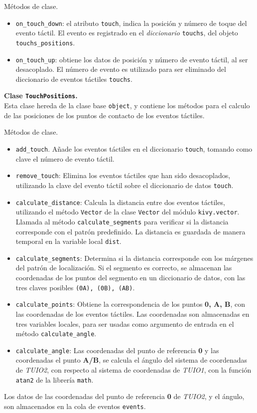 Métodos de clase.
\begin{itemize}
\item \texttt{on\_touch\_down}: el atributo \texttt{touch}, indica la posición y número de toque del evento táctil. El evento es registrado en el \emph{diccionario} \texttt{touchs}, del objeto \texttt{touchs\_positions}.

\item \texttt{on\_touch\_up}: obtiene los datos de posición y número de evento táctil, al ser desacoplado. El número de evento es utilizado para ser eliminado del diccionario de eventos táctiles \texttt{touchs}.
\end{itemize}
\textbf{Clase \texttt{TouchPositions}.}\\ 
Esta clase hereda de la clase base \texttt{object}, y contiene los métodos para el calculo de las posiciones de los puntos de contacto de los eventos táctiles.

Métodos de clase.
\begin{itemize}
\item \texttt{add\_touch}. Añade los eventos táctiles en el diccionario \texttt{touch}, tomando como clave el número de evento táctil.

\item \texttt{remove\_touch}: Elimina los eventos táctiles que han sido desacoplados, utilizando la clave del evento táctil sobre el diccionario de datos \texttt{touch}.

\item \texttt{calculate\_distance}: Calcula la distancia entre dos eventos táctiles, utilizando el método \texttt{Vector} de la clase \texttt{Vector} del módulo \texttt{kivy.vector}. Llamada al método \texttt{calculate\_segments} para verificar si la distancia corresponde con el patrón predefinido. La distancia es guardada de manera temporal en la variable local \texttt{dist}.

\item \texttt{calculate\_segments}: Determina si la distancia corresponde con los márgenes del patrón de localización. Si el segmento es correcto, se almacenan las coordenadas de los puntos del segmento en un diccionario de datos, con las tres claves posibles \texttt{(0A), (0B), (AB)}.

\item \texttt{calculate\_points}: Obtiene la correspondencia de los puntos \textbf{0, A, B}, con las coordenadas de los eventos táctiles. Las coordenadas son almacenadas en tres variables locales, para ser usadas como argumento de entrada en el método \texttt{calculate\_angle}.

\item \texttt{calculate\_angle}: Las coordenadas del punto de referencia \textbf{0} y las coordenadas el punto \textbf{A/B}, se calcula el ángulo del sistema de coordenadas de \emph{TUIO2}, con respecto al sistema de coordenadas de \emph{TUIO1}, con la función \texttt{atan2} de la librería \texttt{math}.
\end{itemize}
Los datos de las coordenadas del punto de referencia \textbf{0} de \emph{TUIO2}, y el ángulo, son almacenados en la cola de eventos \texttt{events}.

